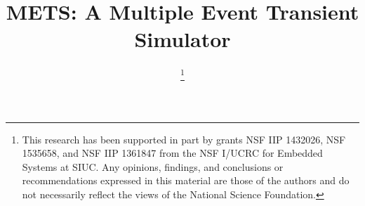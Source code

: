 \documentclass[conference]{IEEEtran}
\begin{document}
%

\title{METS: A Multiple Event Transient Simulator}
\author{
	\thanks{This research has been supported in part by grants NSF IIP 1432026, NSF 1535658,
		and NSF IIP 1361847 from the NSF I/UCRC for Embedded Systems at SIUC. 
		Any opinions, findings, and conclusions or recommendations expressed in this material are those of
		the authors and do not necessarily reflect the views of the National Science
		Foundation.
		}
}
\maketitle

\end{document}
